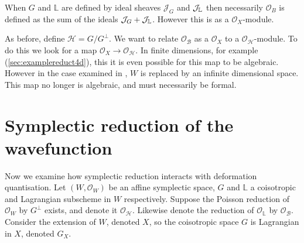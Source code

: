     When \(G\) and \( \mathbb{L}\) are defined by ideal sheaves \( \mathcal{J}_G\) and \(\mathcal{J}_{\mathbb{L}}\) then necessarily \( \mathcal{O}_B\) is defined as the sum of the ideals \( \mathcal{J}_G + \mathcal{J}_{\mathbb{L}}\). However this is as a \( \mathcal{O}_X\)-module.
    
    As before, define \( \mathcal{H} = G/G^{\perp}\). We want to relate \( \mathcal{O}_\mathcal{B}\) as a \( \mathcal{O}_X\) to a \( \mathcal{O}_{\mathcal{H}}\)-module. To do this we look for a map \( \mathcal{O}_X \rightarrow \mathcal{O}_{\mathcal{H}} \). In finite dimensions, for example (\ref{sec:examplereduct4d}), this it is even possible for this map to be algebraic. However in the case examined in \cite{chaimanowong2020airy}, \( W\) is replaced by an infinite dimensional space. This map no longer is algebraic, and must necessarily be formal.
    
    


    \section{Symplectic reduction of the wavefunction}
    \label{section:wavefunction_reduction}
    
    Now we examine how symplectic reduction interacts with deformation quantisation.  Let \( (W,\mathcal{O}_W)\) be an affine symplectic space, \(G\) and \( \mathbb{L}\) a coisotropic and Lagrangian subscheme in \(W\) respectively. Suppose the Poisson reduction of \( \mathcal{O}_W\) by \(G^{\perp}\) exists, and denote it \( \mathcal{O}_{\mathcal{H}}\). Likewise denote the reduction of \( \mathcal{O}_{\mathbb{L}}\) by \( \mathcal{O}_{\mathcal{B}}\). Consider the extension of \(W\), denoted \(X\), so the coisotropic space \(G\) is Lagrangian in \(X\), denoted \(G_X\).
    

